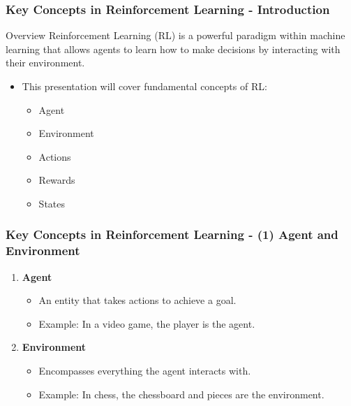 \documentclass[aspectratio=169]{beamer}
\begin{document}
\begin{frame}[fragile]
    \frametitle{Key Concepts in Reinforcement Learning - Introduction}
    \begin{block}{Overview}
        Reinforcement Learning (RL) is a powerful paradigm within machine learning that allows agents to learn how to make decisions by interacting with their environment.
    \end{block}
    \begin{itemize}
        \item This presentation will cover fundamental concepts of RL:
        \begin{itemize}
            \item Agent
            \item Environment
            \item Actions
            \item Rewards
            \item States
        \end{itemize}
    \end{itemize}
\end{frame}

\begin{frame}[fragile]
    \frametitle{Key Concepts in Reinforcement Learning - (1) Agent and Environment}
    \begin{enumerate}
        \item \textbf{Agent}
        \begin{itemize}
            \item An entity that takes actions to achieve a goal.
            \item Example: In a video game, the player is the agent.
        \end{itemize}
        
        \item \textbf{Environment}
        \begin{itemize}
            \item Encompasses everything the agent interacts with.
            \item Example: In chess, the chessboard and pieces are the environment.
        \end{itemize}
    \end{enumerate}
\end{frame}
\end{document}
